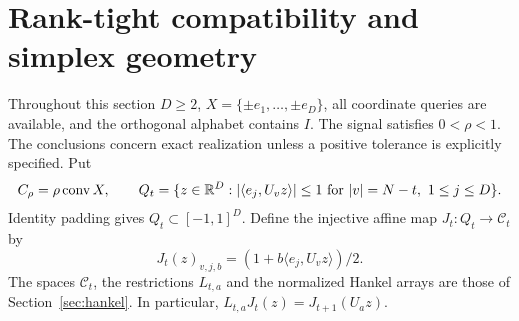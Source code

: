 \section{Rank-tight compatibility and simplex geometry}\label{sec:simplex50}
Throughout this section $D\ge2$, $X=\{\pm e_1,\ldots,\pm e_D\}$,
all coordinate queries are available, and the orthogonal alphabet contains
$I$. The signal satisfies $0<\rho<1$. The conclusions concern exact
realization unless a positive tolerance is explicitly specified. Put
\[
 C_\rho=\rho\operatorname{conv} X,\qquad
 Q_t=\{z\in\mathbb R^D:|\langle e_j,U_vz\rangle|\le1
       \text{ for }|v|=N-t,\ 1\le j\le D\}.
\]
Identity padding gives $Q_t\subset[-1,1]^D$. Define the injective affine
map $J_t:Q_t\to\mathcal C_t$ by
\[
 J_t(z)_{v,j,b}=(1+b\langle e_j,U_vz\rangle)/2.
\]
The spaces $\mathcal C_t$, the restrictions $L_{t,a}$ and the normalized
Hankel arrays are those of Section~\ref{sec:hankel}. In particular,
$L_{t,a}J_t(z)=J_{t+1}(U_az)$.

